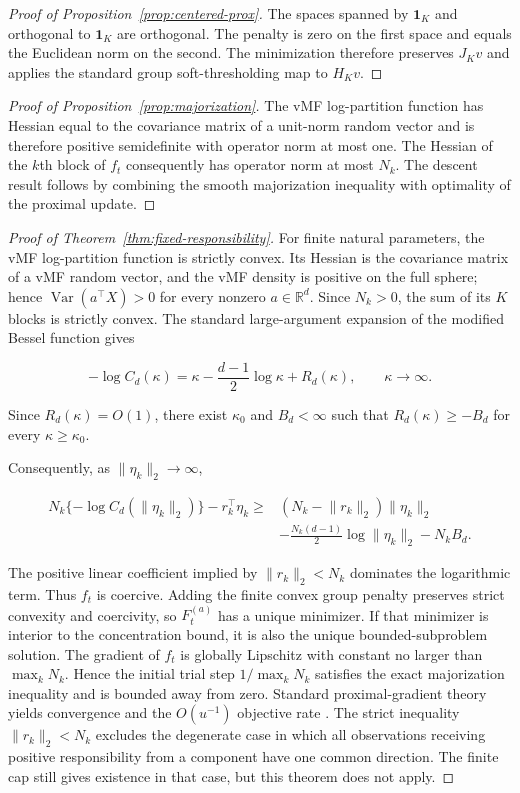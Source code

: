 \documentclass[preprint,12pt,authoryear]{elsarticle}
\begin{document}
\begin{proof}[Proof of Proposition~\ref{prop:centered-prox}]
The spaces spanned by $\mathbf1_K$ and orthogonal to $\mathbf1_K$ are
orthogonal. The penalty is zero on the first space and equals the Euclidean
norm on the second. The minimization therefore preserves $J_Kv$ and applies
the standard group soft-thresholding map to $H_Kv$.
\end{proof}

\begin{proof}[Proof of Proposition~\ref{prop:majorization}]
The vMF log-partition function has Hessian equal to the covariance matrix of a
unit-norm random vector and is therefore positive semidefinite with operator
norm at most one. The Hessian of the $k$th block of $f_t$ consequently has
operator norm at most $N_k$. The descent result follows by combining the
smooth majorization inequality with optimality of the proximal update.
\end{proof}

\begin{proof}[Proof of Theorem~\ref{thm:fixed-responsibility}]
For finite natural parameters, the vMF log-partition function is strictly
convex. Its Hessian is the covariance matrix of a vMF random vector, and the
vMF density is positive on the full sphere; hence
$\operatorname{Var}(a^\top X)>0$ for every nonzero $a\in\mathbb R^d$.
Since $N_k>0$, the sum of its $K$ blocks is strictly convex. The standard
large-argument expansion of the modified Bessel function gives

\[
-\log C_d(\kappa)
=\kappa-\frac{d-1}{2}\log\kappa+R_d(\kappa),
\qquad \kappa\longrightarrow\infty.
\]

Since $R_d(\kappa)=O(1)$, there exist $\kappa_0$ and $B_d<\infty$ such that
$R_d(\kappa)\geq-B_d$ for every $\kappa\geq\kappa_0$.

Consequently, as $\lVert\eta_k\rVert_2\to\infty$,

\[
\begin{aligned}
N_k\{-\log C_d(\lVert\eta_k\rVert_2)\}
-r_k^\top\eta_k
\geq{}&
(N_k-\lVert r_k\rVert_2)\lVert\eta_k\rVert_2
\\
&-\frac{N_k(d-1)}{2}\log\lVert\eta_k\rVert_2
-N_kB_d.
\end{aligned}
\]

The positive linear coefficient implied by
$\lVert r_k\rVert_2<N_k$ dominates the logarithmic term. Thus $f_t$ is
coercive. Adding the finite convex group penalty preserves strict convexity and
coercivity, so $F_t^{(a)}$ has a unique minimizer. If that minimizer is interior to
the concentration bound, it is also the unique bounded-subproblem solution.
The gradient of $f_t$ is globally Lipschitz with constant no larger than
$\max_kN_k$. Hence the initial trial step $1/\max_kN_k$ satisfies the exact
majorization inequality and is bounded away from zero. Standard
proximal-gradient theory yields convergence and the $O(u^{-1})$ objective rate
\citep{beck2009fista}. The strict inequality
$\lVert r_k\rVert_2<N_k$ excludes the degenerate case in which all
observations receiving positive responsibility from a component have one
common direction. The finite cap still gives existence in that case, but
this theorem does not apply.
\end{proof}
\end{document}
